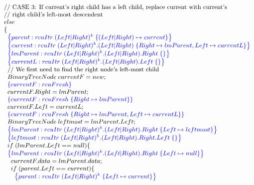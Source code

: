 \[\small
\begin{array}{@{}l@{}}
    \;\;\text{// CASE 3: If current's right child has a left child, replace current with current's}\\
    \;\;\text{//          right child's left-most descendent}\\
    \;\;else\\
    \;\;\{\\
        \;\;\;\;\specline{parent:rcuItr\; (Left|Right)^{k} \; \{ (Left|Right)\mapsto current\} }\\
        \;\;\;\;\specline{current:rcuItr\; (Left|Right)^{k}.(Left|Right) \; \{Right\mapsto lmParent, Left \mapsto currentL \} }\\
        \;\;\;\;\specline{lmParent:rcuItr\; (Left|Right)^{k}.(Left|Right).Right \; \{ \} }\\
        \;\;\;\;\specline{currentL:rcuItr\; (Left|Right)^{k}.(Left|Right).Left \; \{ \} }\\ 
        \;\;\;\;\text{// We first need to find the right node's left-most child}\\    
        \;\;\;\;BinaryTreeNode \;currentF = new;\\
        \;\;\;\;\specline{currentF:rcuFresh }\\
        \;\;\;\;currentF.Right = lmParent;\\
        \;\;\;\;\specline{currentF:rcuFresh \; \{Right\mapsto lmParent\}}\\
        \;\;\;\;currentF.Left = currentL;\\
        \;\;\;\;\specline{currentF:rcuFresh \; \{Right\mapsto lmParent, Left\mapsto currentL\}}\\
        \;\;\;\;BinaryTreeNode \; leftmost = lmParent.Left;\\
        \;\;\;\;\specline{lmParent:rcuItr\; (Left|Right)^{k}.(Left|Right).Right \; \{ Left \mapsto leftmost\} }\\
        \;\;\;\;\specline{leftmost:rcuItr\; (Left|Right)^{k}.(Left|Right).Right.Left \; \{\} }\\
        \;\;\;\;if\;(lmParent.Left == null)\{\\
        \;\;\;\;\specline{lmParent:rcuItr\; (Left|Right)^{k}.(Left|Right).Right \; \{ Left \mapsto null\} }\\
         \;\;\;\;\;\;currentF.data = lmParent.data;\\
         \;\;\;\;\;\;if\; (parent.Left == current)\{\\
                \;\;\;\;\;\;\;\;\specline{parent:rcuItr\; (Left|Right)^{k} \; \{ Left\mapsto current\} }\\

\end{array}\]
